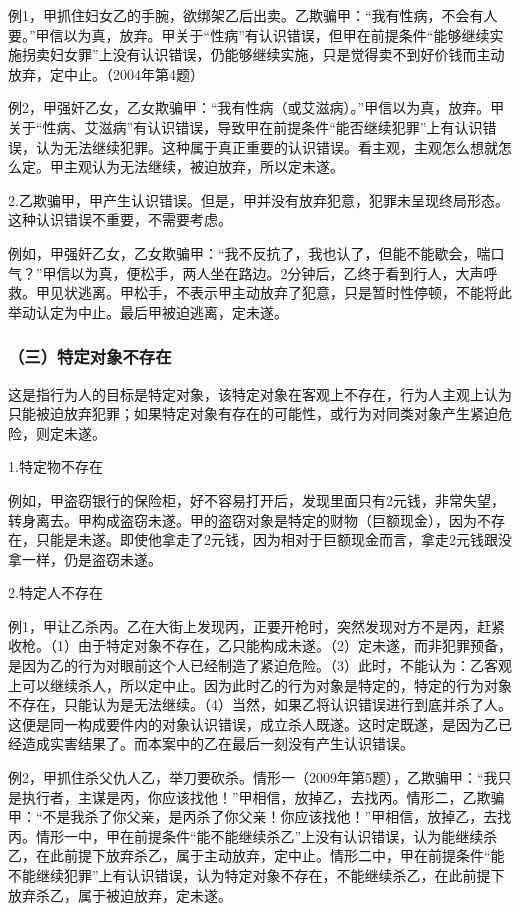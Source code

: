 例1，甲抓住妇女乙的手腕，欲绑架乙后出卖。乙欺骗甲：“我有性病，不会有人要。”甲信以为真，放弃。甲关于“性病”有认识错误，但甲在前提条件“能够继续实施拐卖妇女罪”上没有认识错误，仍能够继续实施，只是觉得卖不到好价钱而主动放弃，定中止。（2004年第4题）

例2，甲强奸乙女，乙女欺骗甲：“我有性病（或艾滋病）。”甲信以为真，放弃。甲关于“性病、艾滋病”有认识错误，导致甲在前提条件“能否继续犯罪”上有认识错误，认为无法继续犯罪。这种属于真正重要的认识错误。看主观，主观怎么想就怎么定。甲主观认为无法继续，被迫放弃，所以定未遂。

2.乙欺骗甲，甲产生认识错误。但是，甲并没有放弃犯意，犯罪未呈现终局形态。这种认识错误不重要，不需要考虑。

例如，甲强奸乙女，乙女欺骗甲：“我不反抗了，我也认了，但能不能歇会，喘口气？”甲信以为真，便松手，两人坐在路边。2分钟后，乙终于看到行人，大声呼救。甲见状逃离。甲松手，不表示甲主动放弃了犯意，只是暂时性停顿，不能将此举动认定为中止。最后甲被迫逃离，定未遂。

\subsubsection*{（三）特定对象不存在}

这是指行为人的目标是特定对象，该特定对象在客观上不存在，行为人主观上认为只能被迫放弃犯罪；如果特定对象有存在的可能性，或行为对同类对象产生紧迫危险，则定未遂。

1.特定物不存在

例如，甲盗窃银行的保险柜，好不容易打开后，发现里面只有2元钱，非常失望，转身离去。甲构成盗窃未遂。甲的盗窃对象是特定的财物（巨额现金），因为不存在，只能是未遂。即使他拿走了2元钱，因为相对于巨额现金而言，拿走2元钱跟没拿一样，仍是盗窃未遂。

2.特定人不存在

例1，甲让乙杀丙。乙在大街上发现丙，正要开枪时，突然发现对方不是丙，赶紧收枪。（1）由于特定对象不存在，乙只能构成未遂。（2）定未遂，而非犯罪预备，是因为乙的行为对眼前这个人已经制造了紧迫危险。（3）此时，不能认为：乙客观上可以继续杀人，所以定中止。因为此时乙的行为对象是特定的，特定的行为对象不存在，只能认为是无法继续。（4）当然，如果乙将认识错误进行到底并杀了人。这便是同一构成要件内的对象认识错误，成立杀人既遂。这时定既遂，是因为乙已经造成实害结果了。而本案中的乙在最后一刻没有产生认识错误。

例2，甲抓住杀父仇人乙，举刀要砍杀。情形一（2009年第5题），乙欺骗甲：“我只是执行者，主谋是丙，你应该找他！”甲相信，放掉乙，去找丙。情形二，乙欺骗甲：“不是我杀了你父亲，是丙杀了你父亲！你应该找他！”甲相信，放掉乙，去找丙。情形一中，甲在前提条件“能不能继续杀乙”上没有认识错误，认为能继续杀乙，在此前提下放弃杀乙，属于主动放弃，定中止。情形二中，甲在前提条件“能不能继续犯罪”上有认识错误，认为特定对象不存在，不能继续杀乙，在此前提下放弃杀乙，属于被迫放弃，定未遂。

